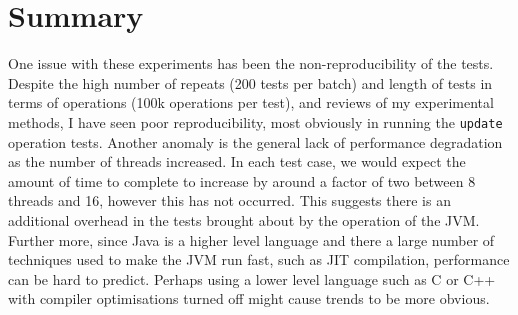 \documentclass[11pt]{article}
\begin{document}
\section{Summary}

One issue with these experiments has been the non-reproducibility of the tests. Despite the high number of repeats (200 tests per batch) and length of tests in terms of operations (100k operations per test), and reviews of my experimental methods, I have seen poor reproducibility, most obviously in running the \texttt{update} operation tests. Another anomaly is the general lack of performance degradation as the number of threads increased. In each test case, we would expect the amount of time to complete to increase by around a factor of two between 8 threads and 16, however this has not occurred. This suggests there is an additional overhead in the tests brought about by the operation of the JVM. Further more, since Java is a higher level language and there a large number of techniques used to make the JVM run fast, such as JIT compilation, performance can be hard to predict. Perhaps using a lower level language such as C or C++ with compiler optimisations turned off might cause trends to be more obvious.
\end{document}
